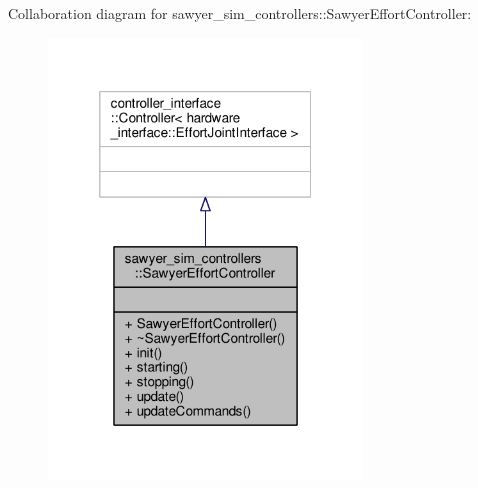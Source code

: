 Collaboration diagram for sawyer\-\_\-sim\-\_\-controllers\-:\-:Sawyer\-Effort\-Controller\-:
\nopagebreak
\begin{figure}[H]
\begin{center}
\leavevmode
\includegraphics[width=236pt]{classsawyer__sim__controllers_1_1_sawyer_effort_controller__coll__graph}
\end{center}
\end{figure}

